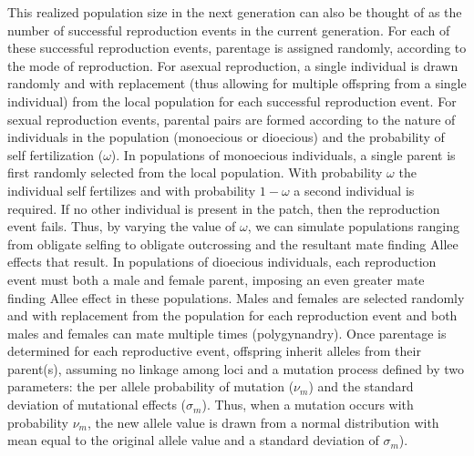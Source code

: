 \documentclass[11pt]{article}
\begin{document}
This realized population size in the next generation can also be thought of as the number of successful reproduction events in the current generation. For each of these successful reproduction events, parentage is assigned randomly, according to the mode of reproduction. For asexual reproduction, a single individual is drawn randomly and with replacement (thus allowing for multiple offspring from a single individual) from the local population for each successful reproduction event. For sexual reproduction events, parental pairs are formed according to the nature of individuals in the population (monoecious or dioecious) and the probability of self fertilization ($\omega$). In populations of monoecious individuals, a single parent is first randomly selected from the local population. With probability $\omega$ the individual self fertilizes and with probability $1-\omega$ a second individual is required. If no other individual is present in the patch, then the reproduction event fails. Thus, by varying the value of $\omega$, we can simulate populations ranging from obligate selfing to obligate outcrossing and the resultant mate finding Allee effects that result. In populations of dioecious individuals, each reproduction event must both a male and female parent, imposing an even greater mate finding Allee effect in these populations. Males and females are selected randomly and with replacement from the population for each reproduction event and both males and females can mate multiple times (polygynandry). Once parentage is determined for each reproductive event, offspring inherit alleles from their parent(s), assuming no linkage among loci and a mutation process defined by two parameters: the per allele probability of mutation ($\nu_{m}$) and the standard deviation of mutational effects ($\sigma_{m}$). Thus, when a mutation occurs with probability $\nu_{m}$, the new allele value is drawn from a normal distribution with mean equal to the original allele value and a standard deviation of $\sigma_{m}$).
\end{document}
